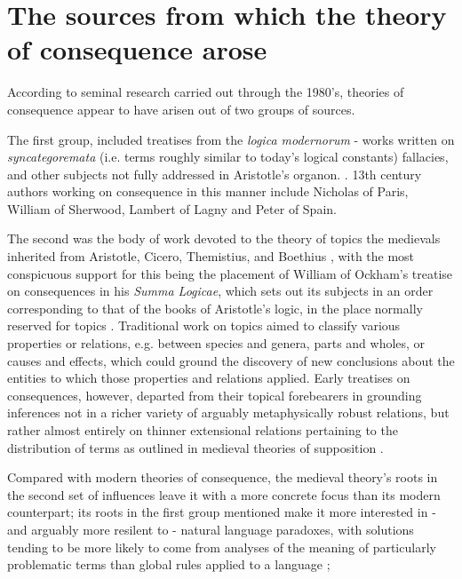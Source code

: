 \documentclass[]{article}
\begin{document}
\section{The sources from which the theory of consequence arose}
According to seminal research carried out through the 1980's,
theories of consequence appear to have arisen out of two groups of sources. 

The first group, 
included treatises 
from the \emph{logica modernorum} 
- 
works written on 
\emph{syncategoremata} (i.e. terms roughly similar to today's logical constants) 
fallacies,
and other subjects not fully addressed in Aristotle's organon. 
\autocite{Green-Pedersen1984,Spruyt2018}.
13th century authors working on consequence in this manner include 
Nicholas of Paris, 
William of Sherwood, 
Lambert of Lagny 
and Peter of Spain.

The second was the body of work devoted to the theory of topics the medievals inherited from Aristotle, 
Cicero, 
Themistius, 
and Boethius \autocite{Stump1982}, 
with the most conspicuous support for this being the placement of William of Ockham's treatise on consequences in his \emph{Summa Logicae}, 
which sets out its subjects in an order corresponding to that of the books of Aristotle's logic, 
in the place normally reserved for topics \autocite{OckhamSL}. 
Traditional work on topics aimed to classify various properties or relations, 
e.g. between species and genera, 
parts and wholes, 
or causes and effects, 
which could ground the discovery of new conclusions about the entities to which those properties and relations applied. 
Early treatises on consequences, 
however, 
departed from their topical forebearers in 
grounding inferences not in a richer variety of arguably metaphysically robust relations, but rather almost entirely on thinner extensional relations pertaining to the distribution of terms as outlined in medieval theories of supposition \autocite{HodgesBurley,Archambault2022,sep-medieval-terms}. 

Compared with modern theories of consequence, 
the medieval theory's roots 
in the second set of influences leave it with a more concrete focus than its modern counterpart;
its roots 
in the first group mentioned 
make it more interested in 
- and arguably more resilent to - 
natural language paradoxes, 
with solutions tending to be more likely to come from analyses of the meaning of particularly problematic terms than global rules applied to a language \autocite{Klima2004,Klima2016}; 
\end{document}
